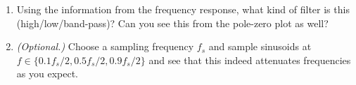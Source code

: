 \documentclass{article}
\begin{document}
\begin{enumerate}
\begin{enumerate}
			\item Using the information from the frequency response, what kind of filter is this (high/low/band-pass)? Can you see this from the pole-zero plot as well?
			
			\item \textit{(Optional.)} Choose a sampling frequency $f_s$ and sample sinusoids at $f\in\{0.1f_s/2,0.5f_s/2,0.9f_s/2\}$ and see that this indeed attenuates frequencies as you expect.
		\end{enumerate}
	\end{enumerate}
	
\end{document}
